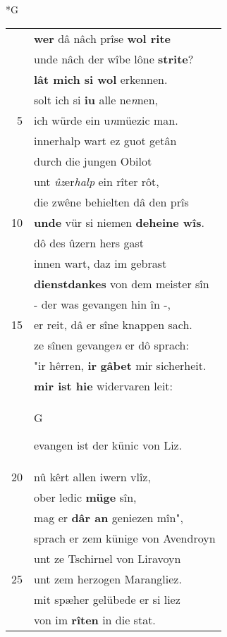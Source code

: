 \documentclass[8pt,a4paper,notitlepage]{article}
\begin{document}
\begin{table}[ht]
\begin{minipage}[t]{0.5\linewidth}
\small
\begin{center}*G
\end{center}
\begin{tabular}{rl}
 & \textbf{wer} dâ nâch prîse \textbf{wol rite}\\ 
 & unde nâch der wîbe lône \textbf{strite}?\\ 
 & \textbf{lât mich si wol} erkennen.\\ 
 & solt ich si \textbf{iu} alle ne\textit{n}nen,\\ 
5 & ich würde ein u\textit{n}müezic man.\\ 
 & innerhalp wart ez guot getân\\ 
 & durch die jungen Obilot\\ 
 & unt \textit{ûz}er\textit{halp} ein rîter rôt,\\ 
 & die zwêne behielten dâ den prîs\\ 
10 & \textbf{unde} vür si niemen \textbf{deheine wîs}.\\ 
 & dô des ûzern hers gast\\ 
 & innen wart, daz im gebrast\\ 
 & \textbf{dienstdankes} von dem meister sîn\\ 
 & - der was gevangen hin în -,\\ 
15 & er reit, dâ er sîne knappen sach.\\ 
 & ze sînen gevange\textit{n} er dô sprach:\\ 
 & "ir hêrren, \textbf{ir} \textbf{gâbet} mir sicherheit.\\ 
 & \textbf{mir ist hie} widervaren leit:\\ 
 & \begin{large}G\end{large}evangen ist der künic von Liz.\\ 
20 & nû kêrt allen iwern vlîz,\\ 
 & ober ledic \textbf{müge} sîn,\\ 
 & mag er \textbf{dâr an} geniezen mîn",\\ 
 & sprach er zem künige von Avendroyn\\ 
 & unt ze Tschirnel von Liravoyn\\ 
25 & unt zem herzogen Marangliez.\\ 
 & mit spæher gelübede er si liez\\ 
 & von im \textbf{rîten} in die stat.\\ 

\end{tabular}
\end{minipage}
\end{table}
\end{document}
